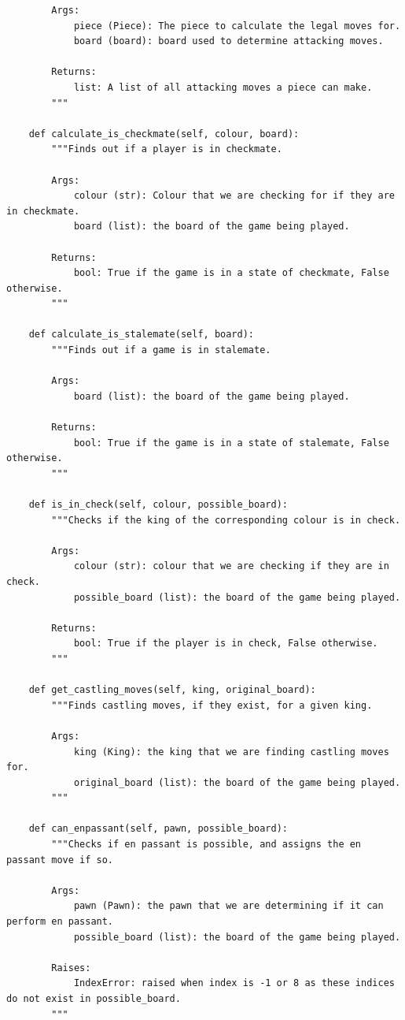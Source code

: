 \documentclass[twoside, 12pt]{report}
\begin{document}
\begin{verbatim}
		Args:
			piece (Piece): The piece to calculate the legal moves for.
			board (board): board used to determine attacking moves.
		
		Returns:
			list: A list of all attacking moves a piece can make.
		"""
	
 	def calculate_is_checkmate(self, colour, board):
		"""Finds out if a player is in checkmate.
	
		Args:
			colour (str): Colour that we are checking for if they are in checkmate.
			board (list): the board of the game being played.
		
		Returns:
			bool: True if the game is in a state of checkmate, False otherwise.
		"""
	
 	def calculate_is_stalemate(self, board):
		"""Finds out if a game is in stalemate.
	
		Args:
			board (list): the board of the game being played.
	
		Returns:
			bool: True if the game is in a state of stalemate, False otherwise.
		"""
	
 	def is_in_check(self, colour, possible_board):
		"""Checks if the king of the corresponding colour is in check.
	
		Args:
			colour (str): colour that we are checking if they are in check.
			possible_board (list): the board of the game being played.
	
		Returns:
			bool: True if the player is in check, False otherwise.
		"""
	
 	def get_castling_moves(self, king, original_board):
		"""Finds castling moves, if they exist, for a given king.
	
		Args:
			king (King): the king that we are finding castling moves for.
			original_board (list): the board of the game being played.
		"""
	
 	def can_enpassant(self, pawn, possible_board):
		"""Checks if en passant is possible, and assigns the en passant move if so.
	
		Args:
			pawn (Pawn): the pawn that we are determining if it can perform en passant.
			possible_board (list): the board of the game being played.
	
		Raises:
			IndexError: raised when index is -1 or 8 as these indices do not exist in possible_board.
		"""
\end{verbatim}
\end{document}
